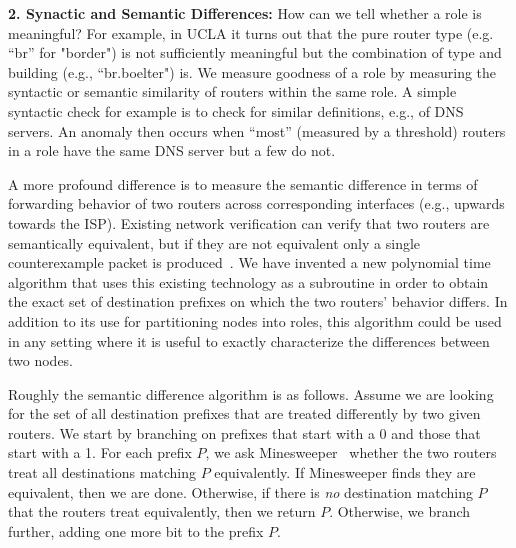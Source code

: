 {\bf 2. Synactic and Semantic Differences:} How can we tell whether a role is meaningful? For example, in UCLA it turns out that the pure router type (e.g. ``br'' for "border") is not sufficiently meaningful but the combination of type and building (e.g., ``br.boelter") is.  We measure goodness of a role by measuring the syntactic or semantic similarity of routers within the same role. A simple syntactic  check for example is to check for similar definitions, e.g., of DNS servers.  An anomaly then occurs when ``most'' (measured by a threshold) routers in a role have the same DNS server but a few do not.  

A more profound difference is to measure the semantic difference in terms of forwarding behavior of two routers across corresponding interfaces (e.g., upwards towards the ISP).  Existing network verification can verify that two routers are semantically equivalent, but if they are not equivalent only a single counterexample packet is produced~\cite{minesweeper}.  We have invented a new polynomial time algorithm that uses this existing technology as a subroutine in order to obtain the exact set of destination prefixes on which the two routers' behavior differs.  In addition to its use for partitioning nodes into roles, this algorithm could be used in any setting where it is useful to exactly characterize the differences between two nodes.  

Roughly the semantic difference algorithm is as follows.  Assume we are looking for the set of all destination prefixes that
are treated differently by two given routers.  We start by branching on prefixes that start with a 0 and those that start with a 1.  For each prefix $P$, we
ask Minesweeper~\cite{minesweeper} whether the two routers treat all destinations matching $P$ equivalently.  If Minesweeper finds they are equivalent, then we are done.  Otherwise, if there is {\em no} destination matching $P$ that the routers treat equivalently, then we return $P$.  Otherwise, we branch further, adding one more bit to the prefix $P$.


